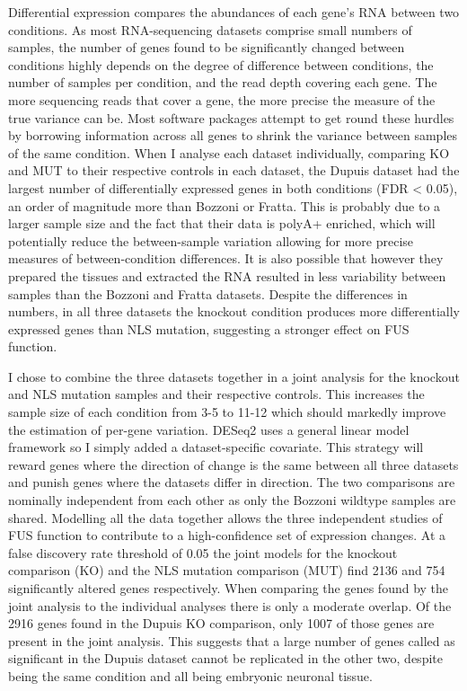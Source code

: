 Differential expression compares the abundances of each gene's RNA between two conditions. 
As most RNA-sequencing datasets comprise small numbers of samples, the number of genes found to be significantly changed between conditions highly depends on the degree of difference between conditions, the number of samples per condition, and the read depth covering each gene. The more sequencing reads that cover a gene, the more precise the measure of the true variance can be.
Most software packages attempt to get round these hurdles by borrowing information across all genes to shrink the variance between samples of the same condition. 
When I analyse each dataset individually, comparing KO and MUT to their respective controls in each dataset, the Dupuis dataset had the largest number of differentially expressed genes in both conditions (FDR < 0.05), an order of magnitude more than Bozzoni or Fratta. 
This is probably due to a larger sample size and the fact that their data is polyA+ enriched, which will potentially reduce the between-sample variation allowing for more precise measures of between-condition differences. 
It is also possible that however they prepared the tissues and extracted the RNA resulted in less variability between samples than the Bozzoni and Fratta datasets.
Despite the differences in numbers, in all three datasets the knockout condition produces more differentially expressed genes than NLS mutation, suggesting a stronger effect on FUS function.


I chose to combine the three datasets together in a joint analysis for the knockout and NLS mutation samples and their respective controls. 
This increases the sample size of each condition from 3-5 to 11-12 which should markedly improve the estimation of per-gene variation. 
DESeq2 uses a general linear model framework so I simply added a dataset-specific covariate. 
This strategy will reward genes where the direction of change is the same between all three datasets and punish genes where the datasets differ in direction. 
The two comparisons are nominally independent from each other as only the Bozzoni wildtype samples are shared.
Modelling all the data together allows the three independent studies of FUS function to contribute to a high-confidence set of expression changes. At a false discovery rate threshold of 0.05 the joint models for the knockout comparison (KO) and the NLS mutation comparison (MUT) find 2136 and 754 significantly altered genes respectively. 
When comparing the genes found by the joint analysis to the individual analyses there is only a moderate overlap. 
Of the 2916 genes found in the Dupuis KO comparison, only 1007 of those genes are present in the joint analysis.
This suggests that a large number of genes called as significant in the Dupuis dataset cannot be replicated in the other two, despite being the same condition and all being embryonic neuronal tissue.

